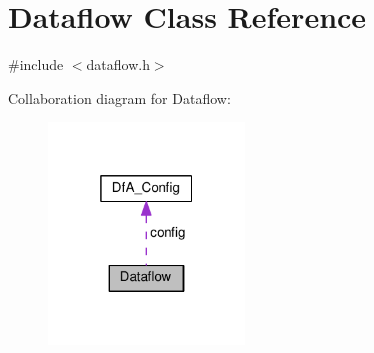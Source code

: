 \hypertarget{classDataflow}{}\section{Dataflow Class Reference}
\label{classDataflow}


{\ttfamily \#include $<$dataflow.\+h$>$}



Collaboration diagram for Dataflow\+:
\nopagebreak
\begin{figure}[H]
\begin{center}
\leavevmode
\includegraphics[width=148pt]{classDataflow__coll__graph}
\end{center}
\end{figure}
